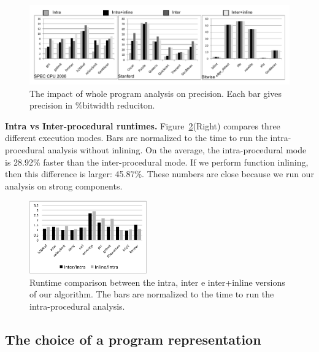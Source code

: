 \documentclass{paper}
\begin{document}
\begin{figure}[t!]
\begin{center}
\includegraphics[width=\textwidth]{images/wholeImpact}
\end{center}
\caption{\label{fig:wholeImpact}
The impact of whole program analysis on precision. Each bar gives precision in
\%bitwidth reduciton.}
\end{figure}

\noindent
\textbf{Intra vs Inter-procedural runtimes.}
Figure~\ref{fig:timeComp}(Right) compares three different execution modes.
Bars are normalized to the time to run the intra-procedural analysis
without inlining.
On the average, the intra-procedural mode is 28.92\% faster than the
inter-procedural mode.
If we perform function inlining, then this difference is larger: 45.87\%.
These numbers are close because we run our analysis on strong components.

\begin{figure}[t!]
\begin{center}
\includegraphics[width=0.45\textwidth]{images/timeIntraInterInline}
\end{center}
\caption{\label{fig:timeComp}
Runtime comparison between the intra, inter e inter+inline versions of
our algorithm.
The bars are normalized to the time to run the intra-procedural analysis.
}
\end{figure}


\subsection{The choice of a program representation}
\label{sub:program_rep}
\end{document}
